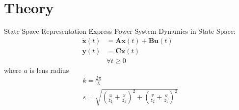 \section[Theory]{Theory}
\label{sec:lasso_theory}

\begin{frame}[fragile]{State Space Representation}
	Express Power System Dynamics in State Space:
	\begin{equation}
		\label{eq:ssr}
		\begin{align}
			\dot{\textbf{x}}(t) &= 
			 \textbf{A}\textbf{x}(t)
			+ \textbf{B}\textbf{u}(t)\\
			\textbf{y}(t) &= 
			 \textbf{C}\textbf{x}(t)\\  
			& \forall t\geq0
			
		\end{align}
	\end{equation}
where $a$ is lens radius
	\begin{align*}
		& k=\frac{2 \pi }{\lambda }                                                                      \\
		& s=\sqrt{\left(\frac{u}{z_2}+\frac{x}{z_1}\right)^2+\left(\frac{v}{z_2}+\frac{y}{z_1}\right)^2} 
	\end{align*}
\end{frame}